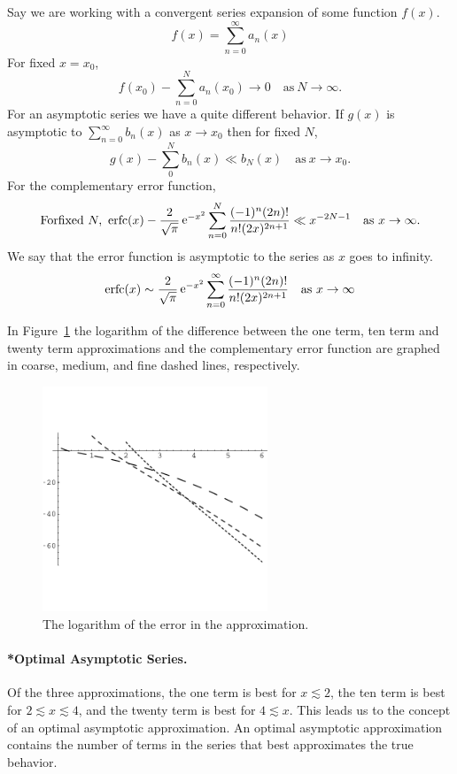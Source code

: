 \begin{Example}
  Say we are working with a convergent series expansion of some function $f(x)$.
  \[f(x) = \sum_{n=0}^\infty a_n(x)\]
  For fixed $x=x_0$, 
  \[ f(x_0) - \sum_{n=0}^N a_n(x_0) \to 0 \quad \mathrm{as}\ N \to \infty.\]
  For an asymptotic series we have a quite different behavior.
  If $g(x)$ is asymptotic to $\sum_{n = 0}^\infty b_n(x)$ as $x \to x_0$ then
  for fixed $N$,
  \[ g(x) - \sum_0^N b_n(x) \ll b_N(x) \quad \mathrm{as}\ x \to x_0. \]
  For the complementary error function,
  \[\mathrm{For fixed}\ N,\ \mathop{\mathrm{erfc}}\nolimits(x) - \frac{2}{\sqrt{\pi}} \mathop{\mathrm{e}}\nolimits^{-x^2} 
  \sum_{n=0}^N \frac{(-1)^n (2n)!}{n! (2x)^{2n+1}} \ll x^{-2N-1} \quad
  \mathrm{as}\ x \to \infty.\]
  We say that the error function is asymptotic to the series as $x$ goes to 
  infinity.
  \[ \mathop{\mathrm{erfc}}\nolimits(x) \sim \frac{2}{\sqrt{\pi}} \mathop{\mathrm{e}}\nolimits^{-x^2} \sum_{n=0}^\infty 
  \frac{(-1)^n (2n)!}{n! (2x)^{2n+1}} \quad \mathrm{as}\ x \to \infty\]

  In Figure~\ref{one_ten_twenty} the logarithm of the difference between the one
  term, ten term and twenty term approximations and the complementary
  error function are graphed in coarse, medium, and fine dashed lines,
  respectively.




  \begin{figure}[h!]
    \begin{center}
      \includegraphics[width=0.6\textwidth]{ode/asymptotic/one1020}
    \end{center}
    \caption{The logarithm of the error in the approximation.}
    \label{one_ten_twenty}
  \end{figure}


  

  \paragraph{*Optimal Asymptotic Series.}
  Of the three approximations, the one term is best for $x \lesssim 2$,
  the ten term is best for $2 \lesssim x \lesssim 4$, and the twenty term
  is best for $4 \lesssim x$.  This leads us to the concept of an optimal
  asymptotic approximation.  An optimal asymptotic approximation contains 
  the number of terms in the series that best approximates the true 
  behavior.


\end{Example}
